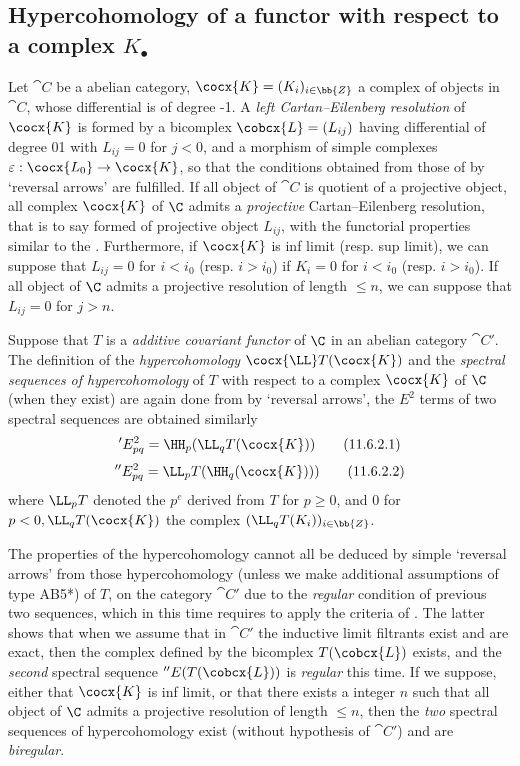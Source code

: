 \subsection{Hypercohomology of a functor with respect to a complex $K_{\bullet}$}
\label{subsection:0.11.6}
\begin{env}[11.6.1]
Let $\cat{C}$ be a abelian category, $\cocx{K} = (K_i)_{i\in \bb{Z}}$ a complex of objects in $\cat{C}$, whose differential is of degree -1.
A \emph{left Cartan--Eilenberg resolution} of $\cocx{K}$ is formed by a bicomplex $\cobcx{L} = (L_{ij})$ having differential of degree 01 with $L_{ij} = 0$ for $j<0$, 
and a morphism of simple complexes $\varepsilon: \cocx{L_0}\rightarrow \cocx{K}$, so that the conditions obtained from those of  by `reversal arrows' are fulfilled.
If all object of $\cat{C}$ is quotient of a projective object, all complex $\cocx{K}$ of $\C$ admits a \emph{projective} Cartan--Eilenberg resolution, 
that is to say formed of projective object $L_{ij}$, with the functorial properties similar to the .
Furthermore, if $\cocx{K}$ is inf limit (resp. sup limit), we can suppose that $L_{ij} = 0$ for $i<i_0$ (resp. $i>i_0$) if $K_i = 0$ for $i<i_0$ (resp. $i>i_0$).
If all object of $\C$ admits a projective resolution of length $\leq n$, we can suppose that $L_{ij} = 0$ for $j>n$.
\end{env}

\begin{env}[11.6.2]
Suppose that $T$ is a \emph{additive covariant functor} of $\C$ in an abelian category $\cat{C'}$.
The definition of the \emph{hypercohomology} $\cocx{\LL}T(\cocx{K})$ and the \emph{spectral sequences of hypercohomology} of $T$ with respect to a complex $\cocx{K}$ of $\C$ (when they exist) 
are again done from  by `reversal arrows', the $E^2$ terms of two spectral sequences are obtained similarly 
\[
  \label{0.11.6.2.1}
  'E_{pq}^2 = \HH_p(\LL_q T(\cocx{K}))
  \tag{11.6.2.1}
\]
\[
  \label{0.11.6.2.2}
  ''E_{pq}^2 = \LL_p T(\HH_q(\cocx{K})))
  \tag{11.6.2.2}
\]
where $\LL_p T$ denoted the $p^e$ derived from $T$ for $p\geq 0$, and 0 for $p<0, \LL_q T(\cocx{K})$ the complex $(\LL_q T(K_i))_{i\in \bb{Z}}$.

The properties of the hypercohomology cannot all be deduced by simple `reversal arrows' from those hypercohomology (unless we make additional assumptions of type AB5*) of $T$, 
 on the category $\cat{C'}$ due to the \emph{regular} condition of previous two sequences, which in this time requires to apply the criteria of .
The latter shows that when we assume that in $\cat{C'}$ the inductive limit filtrants exist and are exact, then the complex defined by the bicomplex $T(\cobcx{L})$ exists, 
and the \emph{second} spectral sequence $''E(T(\cobcx{L}))$ is \emph{regular} this time.
If we suppose, either that $\cocx{K}$ is inf limit, or that there exists a integer $n$ such that all object of $\C$ admits a projective resolution of length $\leq n$, 
then the \emph{two} spectral sequences of hypercohomology exist (without hypothesis of $\cat{C'}$) and are \emph{biregular}.
\end{env}

